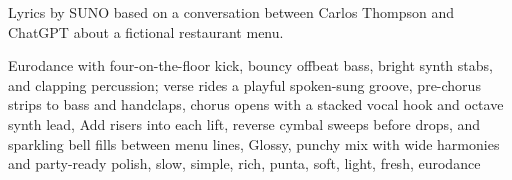 
\begin{notes}
Lyrics by SUNO based on a conversation between Carlos Thompson and ChatGPT about a fictional restaurant menu.
\end{notes}
\begin{style}
Eurodance with four-on-the-floor kick, bouncy offbeat bass, bright synth stabs, and clapping percussion; verse rides a playful spoken-sung groove, pre-chorus strips to bass and handclaps, chorus opens with a stacked vocal hook and octave synth lead, Add risers into each lift, reverse cymbal sweeps before drops, and sparkling bell fills between menu lines, Glossy, punchy mix with wide harmonies and party-ready polish, slow, simple, rich, punta, soft, light, fresh, eurodance
\end{style}
